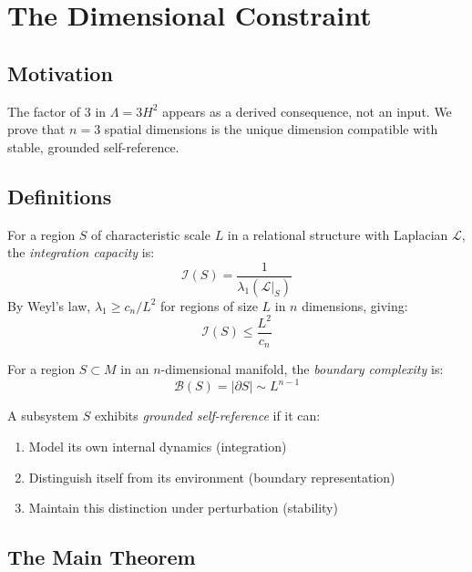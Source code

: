 
\section{The Dimensional Constraint}

\subsection{Motivation}

The factor of 3 in $\Lambda = 3H^2$ appears as a derived consequence, not an input. We prove that $n = 3$ spatial dimensions is the unique dimension compatible with stable, grounded self-reference.

\subsection{Definitions}

\begin{definition}
For a region $S$ of characteristic scale $L$ in a relational structure with Laplacian $\mathcal{L}$, the \emph{integration capacity} is:
\[
\mathcal{I}(S) = \frac{1}{\lambda_1(\mathcal{L}|_S)}
\]
By Weyl's law, $\lambda_1 \geq c_n / L^2$ for regions of size $L$ in $n$ dimensions, giving:
\[
\mathcal{I}(S) \leq \frac{L^2}{c_n}
\]
\end{definition}

\begin{definition}
For a region $S \subset M$ in an $n$-dimensional manifold, the \emph{boundary complexity} is:
\[
\mathcal{B}(S) = |\partial S| \sim L^{n-1}
\]
\end{definition}

\begin{definition}
A subsystem $S$ exhibits \emph{grounded self-reference} if it can:
\begin{enumerate}
    \item Model its own internal dynamics (integration)
    \item Distinguish itself from its environment (boundary representation)
    \item Maintain this distinction under perturbation (stability)
\end{enumerate}
\end{definition}

\subsection{The Main Theorem}

